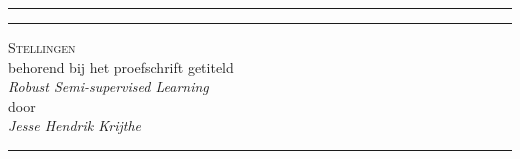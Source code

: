 \documentclass[9pt,b5paper]{book}
\newcommand{\spacedallcaps}[1]{\textssc{\MakeTextUppercase{#1}}}%
\newlength{\headerspacing}
\begin{document}
\begin{center}
\vspace{100pt}

 \hrule height 1ex \hfill
\vspace{5pt}
\hrule
\vspace{10pt}

\textsc{Stellingen}\\
\vspace{\headerspacing}
behorend bij het proefschrift getiteld\\
\vspace{\headerspacing}
\textit{Robust Semi-supervised Learning}\\
\vspace{1mm}
door\\
\vspace{1mm}
\textit{Jesse Hendrik Krijthe}\\
\end{center}
\hrule
\vspace*{0.1cm}
\end{document}
